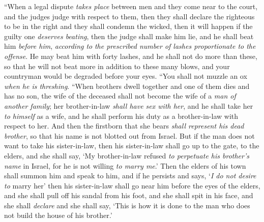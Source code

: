 \begin{biblechapter} %
\verse “When a legal dispute \textit{takes place} between men and they come near to the court, and the judges judge with respect to them, then they shall declare the righteous to be in the right and they shall condemn the wicked,
\verse then it will happen if the guilty one \textit{deserves beating}, then the judge shall make him lie, and he shall beat him \textit{before him}, \textit{according to} \textit{the prescribed number of lashes proportionate to the offense}.
\verse He may beat him with forty lashes, and he shall not do more than these, so that he will not beat more in addition to these many blows, and your countryman would be degraded before your eyes.
\verse “You shall not muzzle an ox \textit{when he is threshing}.
\verse “When brothers dwell together and one of them dies and has no son, the wife of the deceased shall not become the wife of a \textit{man of another family}; her brother-in-law \textit{shall have sex with her}, and he shall take her \textit{to himself} as a wife, and he shall perform his duty as a brother-in-law with respect to her.
\verse And then the firstborn that she bears \textit{shall represent his dead brother}, so that his name is not blotted out from Israel.
\verse But if the man does not want to take his sister-in-law, then his sister-in-law shall go up to the gate, to the elders, and she shall say, ‘My brother-in-law refused \textit{to perpetuate his brother’s name} in Israel, for he is not willing \textit{to marry me}.’
\verse Then the elders of his town shall summon him and speak to him, and if he persists and says, ‘\textit{I do not desire to} marry her’
\verse then his sister-in-law shall go near him before the eyes of the elders, and she shall pull off his sandal from his foot, and she shall spit in his face, and she shall \textit{declare} and she shall say, ‘This is how it is done to the man who does not build the house of his brother.’

\end{biblechapter}
